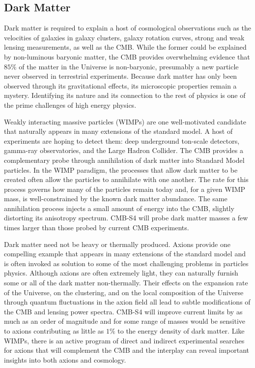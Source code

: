 \subsection*{Dark Matter}


Dark matter is required to explain a host of cosmological observations such as the velocities of galaxies in galaxy clusters, galaxy rotation curves, strong and weak lensing measurements, as well as the CMB. While the former could be explained by non-luminous baryonic matter, the CMB provides overwhelming evidence that $85\%$ of the matter in the Universe is non-baryonic, presumably a new particle never observed in terrestrial experiments. Because dark matter has only been observed through its gravitational effects, its microscopic properties remain a mystery. Identifying its nature and its connection to the rest of physics is one of the prime challenges of high energy physics.

Weakly interacting massive particles (WIMPs) are one well-motivated candidate that naturally appears in many extensions of the standard model. A host of experiments are hoping to detect them: deep underground ton-scale detectors, gamma-ray observatories, and the Large Hadron Collider. The CMB provides a complementary probe through annihilation of dark matter into Standard Model particles.   In the WIMP paradigm, the processes that allow dark matter to be created often allow the particles to annihilate with one another. The rate for this process governs how many of the particles remain today and, for a given WIMP mass, is well-constrained by the known dark matter abundance. The same annihilation process injects a small amount of energy into the CMB, slightly distorting its anisotropy spectrum. CMB-S4 will probe dark matter masses a few times larger than those probed by current CMB experiments.%

Dark matter need not be heavy or thermally produced. Axions provide one compelling example that appears in many extensions of the standard model and is often invoked as solution to some of the most challenging problems in particles physics. Although axions are often extremely light, they can naturally furnish some or all of the dark matter non-thermally. Their effects on the expansion rate of the Universe, on the clustering, and on the local composition of the Universe through quantum fluctuations in the axion field all lead to subtle modifications of the CMB and lensing power spectra. CMB-S4 will improve current limits by as much as an order of magnitude and for some range of masses would be sensitive to axions contributing as little as $1\%$ to the energy density of dark matter.  Like WIMPs, there is an active program of direct and indirect experimental searches for axions that will complement the CMB and the interplay can reveal important insights into both axions and cosmology.


